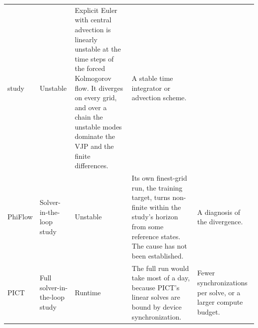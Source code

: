 \begin{table}[h]
\begin{tabularx}{\linewidth}{@{}>{\raggedright}p{1.75cm}>{\raggedright}p{2.15cm}>{\raggedright}p{1.7cm}>{\raggedright}X>{\raggedright\arraybackslash}X@{}}
        study & Unstable
      & Explicit Euler with central advection is linearly unstable at the
        time steps of the forced Kolmogorov flow. It diverges on every grid,
        and over a chain the unstable modes dominate the VJP and the finite
        differences.
      & A stable time integrator or advection scheme. \\
    PhiFlow & Solver-in-the-loop study & Unstable
      & Its own finest-grid run, the training target, turns non-finite within
        the study's horizon from some reference states. The cause has not been
        established.
      & A diagnosis of the divergence. \\
    PICT & Full solver-in-the-loop study & Runtime
      & The full run would take most of a day, because PICT's linear solves
        are bound by device synchronization.
      & Fewer synchronizations per solve, or a larger compute budget. \\
    \bottomrule
  \end{tabularx}
\end{table}
